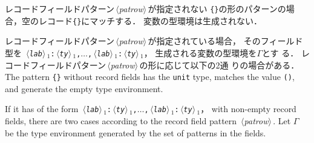 \documentclass{jbook}
\newcommand{\code}[1]{\mbox{\large\tt #1}}
\newcommand{\nonterm}[1]{\mbox{$\,\langle$}{\it #1}\mbox{$\rangle\,$}}
\newcommand{\ass}{\Gamma}
\begin{document}
\ifjp%
		レコードフィールドパターン\nonterm{patrow}が指定されない
\code{\{\}}の形のパターンの場合，空のレコード\code{\{\}}にマッチする．
	変数の型環境は生成されない．

	レコードフィールドパターン\nonterm{patrow}が指定されている場合，
そのフィールド型を
\code{\nonterm{lab}$_1$:\nonterm{ty}$_1$,$\ldots$,\nonterm{lab}$_1$:\nonterm{ty}$_1$}，
生成される変数の型環境を$\ass$とす
る．
	レコードフィールドパターン\nonterm{patrow}の形に応じて以下の2通
りの場合がある．
\else%
	The pattern \code{\{\}} without record fields has the 
\code{unit} type, matches the value \code{()}, and generate the empty
type environment.

	If it has of the form 
\code{\nonterm{lab}$_1$:\nonterm{ty}$_1$,$\ldots$,\nonterm{lab}$_1$:\nonterm{ty}$_1$}，
with non-empty record fields, there are two cases according to the
record field pattern \nonterm{patrow}.
	Let $\ass$ be the type environment generated by the set of
patterns in the fields.
\fi%
\end{document}

